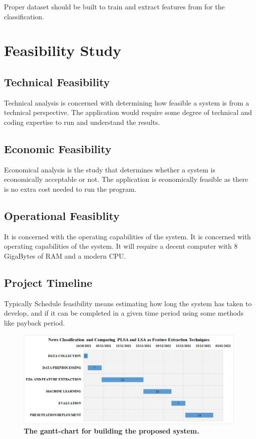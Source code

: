 \documentclass[12pt]{report}
\begin{document}
                    Proper dataset should be built to train and extract features from for the classification. 
            
        \section{Feasibility Study}
            
            \subsection{Technical Feasibility}
            
            Technical analysis is concerned with determining how feasible a system is from a technical
perspective.
                The application would require some degree of technical and coding expertise to run and understand the results.

            \subsection{Economic Feasibility}
            Economical analysis is the study that determines whether a system is economically acceptable or
not.
                The application is economically feasible as there is no extra cost needed to run the program.
            \subsection{Operational Feasiblity}
            It is concerned with the operating capabilities of the system.
                It is concerned with operating capabilities of the system. It will require a decent computer with 8 GigaBytes of RAM and a modern CPU. 

             
        \subsection{Project Timeline}
        Typically Schedule feasibility means estimating how long the system has taken to develop, and if
it can be completed in a given time period using some methods like payback period.
                \begin{figure}[h!]
                    \includegraphics[scale=0.45]{gantt1.png}
                    \caption{\textbf{The gantt-chart for building the proposed system.}}
                \end{figure}
          
\end{document}
